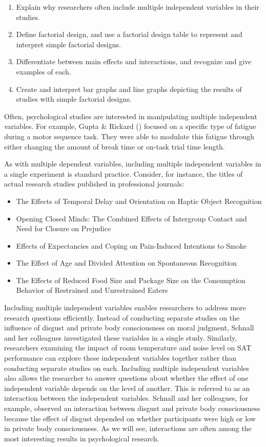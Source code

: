 \documentclass[
]{krantz}
\providecommand{\tightlist}{%
  \setlength{\itemsep}{0pt}\setlength{\parskip}{0pt}}
\begin{document}
\begin{enumerate}
\def\labelenumi{\arabic{enumi}.}
\tightlist
\item
  Explain why researchers often include multiple independent variables in their studies.
\item
  Define factorial design, and use a factorial design table to represent and interpret simple factorial designs.
\item
  Differentiate between main effects and interactions, and recognize and give examples of each.
\item
  Create and interpret bar graphs and line graphs depicting the results of studies with simple factorial designs.
\end{enumerate}

Often, psychological studies are interested in manipulating multiple independent variables. For example, Gupta \& Rickard () focused on a specific type of fatigue during a motor sequence task. They were able to modulate this fatigue through either changing the amount of break time or on-task trial time length.

As with multiple dependent variables, including multiple independent variables in a single experiment is standard practice. Consider, for instance, the titles of actual research studies published in professional journals:

\begin{itemize}
\tightlist
\item
  The Effects of Temporal Delay and Orientation on Haptic Object Recognition
\item
  Opening Closed Minds: The Combined Effects of Intergroup Contact and Need for Closure on Prejudice
\item
  Effects of Expectancies and Coping on Pain-Induced Intentions to Smoke
\item
  The Effect of Age and Divided Attention on Spontaneous Recognition
\item
  The Effects of Reduced Food Size and Package Size on the Consumption Behavior of Restrained and Unrestrained Eaters
\end{itemize}

Including multiple independent variables enables researchers to address more research questions efficiently. Instead of conducting separate studies on the influence of disgust and private body consciousness on moral judgment, Schnall and her colleagues investigated these variables in a single study. Similarly, researchers examining the impact of room temperature and noise level on SAT performance can explore these independent variables together rather than conducting separate studies on each. Including multiple independent variables also allows the researcher to answer questions about whether the effect of one independent variable depends on the level of another. This is referred to as an interaction between the independent variables. Schnall and her colleagues, for example, observed an interaction between disgust and private body consciousness because the effect of disgust depended on whether participants were high or low in private body consciousness. As we will see, interactions are often among the most interesting results in psychological research.
\end{document}
